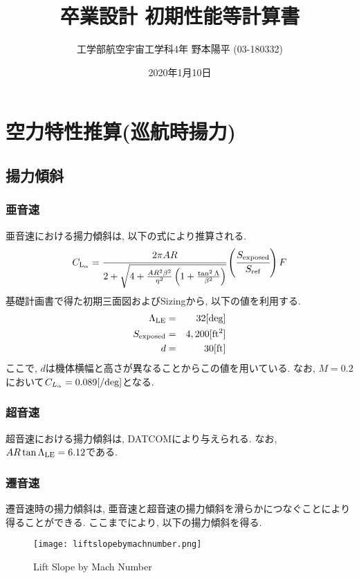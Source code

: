 \documentclass[12pt]{jsarticle}
\title{\Huge{卒業設計 初期性能等計算書}}
\author{\LARGE{工学部航空宇宙工学科4年 野本陽平 (03-180332)}}
\date{\large{2020年1月10日}}
\begin{document}
\maketitle
\newpage
\tableofcontents
\newpage

\section{空力特性推算(巡航時揚力)}
\subsection{揚力傾斜}

\subsubsection*{亜音速}
亜音速における揚力傾斜は, 以下の式により推算される.
\begin{eqnarray*}
C_{\rm L_{\alpha}} = \cfrac{2\pi AR}{2 + \sqrt{4 + \frac{AR^2 \beta^2}{\eta^2}\left(1 + \frac{\tan^2 \Lambda}{\beta^2}\right)}}\left(\cfrac{S_{\rm exposed}}{S_{\rm ref}}\right)F
\end{eqnarray*}
基礎計画書で得た初期三面図およびSizingから, 以下の値を利用する.
\begin{eqnarray*}
\Lambda_{\rm LE} &=& 32 [{\rm deg}] \\
S_{\rm exposed} &=& 4,200 [{\rm ft^2}] \\
d &=& 30 [{\rm ft}]
\end{eqnarray*}
ここで, $d$は機体横幅と高さが異なることからこの値を用いている. なお, $M=0.2$において$C_{L_{\alpha}}=0.089[{\rm /deg}]$となる.

\subsubsection*{超音速}
超音速における揚力傾斜は, DATCOMにより与えられる. なお, $AR\tan\Lambda_{\rm LE} = 6.12$である.

\subsubsection*{遷音速}
遷音速時の揚力傾斜は, 亜音速と超音速の揚力傾斜を滑らかにつなぐことにより得ることができる. ここまでにより, 以下の揚力傾斜を得る.
\begin{figure}[H]
\begin{center}
\texttt{[image: liftslopebymachnumber.png]}
\caption{Lift Slope by Mach Number}
\end{center}
\end{figure}
\end{document}
